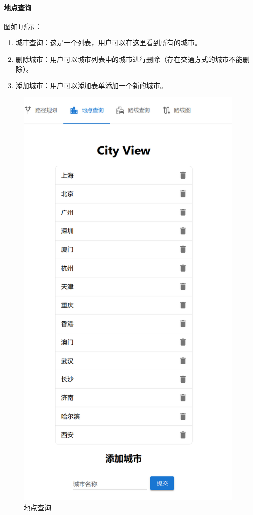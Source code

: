 \documentclass[10pt]{article}
\begin{document}
    \paragraph{地点查询} 图如\ref{fig:screenshot004}所示：
    \begin{enumerate}
        \item 城市查询：这是一个列表，用户可以在这里看到所有的城市。
        \item 删除城市：用户可以城市列表中的城市进行删除（存在交通方式的城市不能删除）。
        \item 添加城市：用户可以添加表单添加一个新的城市。
    \end{enumerate}
    \begin{figure}
        \centering
        \includegraphics[width=0.5\linewidth]{img/screenshot004}
        \caption{地点查询}
        \label{fig:screenshot004}
    \end{figure}
\end{document}
